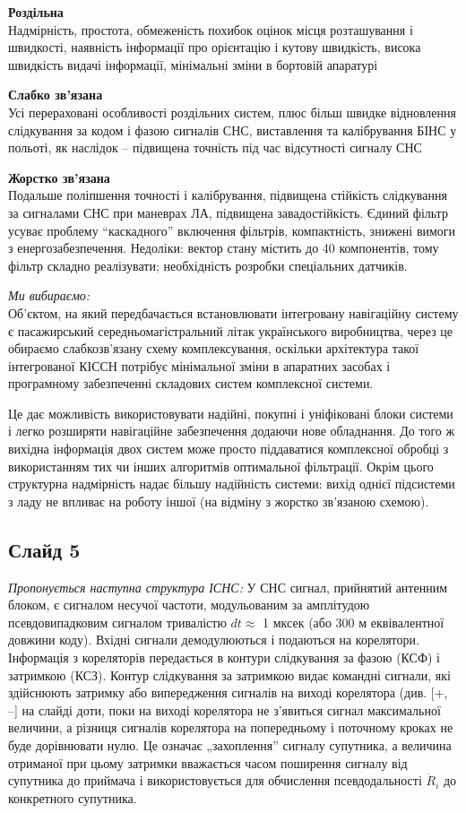 \documentclass[ukrainian,utf8,simple,floatsubsection, hpadding=1mm,equationsubsection,12pt]{eskdtext}
\begin{document}
\textbf{Роздільна}\\
Надмірність, простота, обмеженість похибок оцінок місця розташування і швидкості, наявність інформації про орієнтацію і кутову швидкість, висока швидкість видачі інформації, мінімальні зміни в бортовій апаратурі

\textbf{Слабко зв'язана}\\
Усі перераховані особливості роздільних систем, плюс більш швидке відновлення слідкування за кодом і фазою сигналів СНС, виставлення та калібрування БІНС у польоті, як наслідок -- підвищена точність під час відсутності сигналу СНС

\textbf{Жорстко зв'язана}\\
Подальше поліпшення точності і калібрування, підвищена стійкість слідкування за сигналами СНС при маневрах ЛА, підвищена завадостійкість. Єдиний фільтр усуває проблему ``каскадного'' включення фільтрів, компактність, знижені вимоги з енергозабезпечення. Недоліки: вектор стану містить до 40 компонентів, тому фільтр складно реалізувати; необхідність розробки спеціальних датчиків.

\textit{Ми вибираємо:}\\
Об'єктом, на який передбачається встановлювати інтегровану навігаційну систему є пасажирський середньомагістральний літак українського виробництва, через це обираємо  слабкозв’язану схему комплексування, оскільки архітектура такої інтегрованої КІССН потрібує мінімальної зміни в апаратних засобах і програмному забезпеченні складових систем комплексної системи. 

Це дає можливість використовувати надійні, покупні і уніфіковані блоки системи і легко розширяти навігаційне забезпечення додаючи нове обладнання. До того ж вихідна інформація двох систем може просто піддаватися комплексної обробці з використанням тих чи інших алгоритмів оптимальної фільтрації. Окрім цього структурна надмірність надає більшу надійність системи: вихід однієї підсистеми з ладу не впливає на роботу іншої (на відміну з жорстко зв’язаною схемою).

\subsection*{Слайд 5}

\textit{Пропонується наступна структура ІСНС:}
У СНС сигнал, прийнятий антенним блоком, є сигналом несучої частоти,  модульованим за амплітудою псевдовипадковим сигналом тривалістю  $dt \approx$ 1 мксек (або 300 м еквівалентної довжини коду). Вхідні сигнали демодулюються і подаються на корелятори.  Інформація з кореляторів передається в контури слідкування за фазою (КСФ) і затримкою (КСЗ). Контур слідкування за затримкою видає командні сигнали, які здійснюють  затримку або випередження сигналів на виході корелятора (див. [+, --] на слайді доти, поки на виході корелятора не з'явиться сигнал максимальної величини, а різниця сигналів корелятора на попередньому і поточному кроках не буде дорівнювати нулю. Це означає „захоплення'' сигналу супутника, а величина отриманої при цьому затримки  вважається часом поширення сигналу від супутника до приймача і використовується для обчислення псевдодальності $\dot{R}_{i}$ до конкретного супутника.
\end{document}

